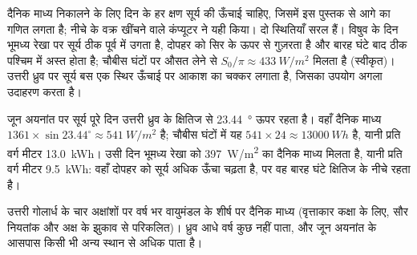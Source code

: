 दैनिक माध्य निकालने के लिए दिन के हर क्षण सूर्य की ऊँचाई चाहिए, जिसमें इस पुस्तक से
आगे का गणित लगता है; नीचे के वक्र खींचने वाले कंप्यूटर ने यही किया। दो स्थितियाँ सरल
हैं। विषुव के दिन भूमध्य रेखा पर सूर्य ठीक पूर्व में उगता है, दोपहर को सिर के ऊपर से गुज़रता है
और बारह घंटे बाद ठीक पश्चिम में अस्त होता है; चौबीस घंटों पर औसत लेने से
$S_0/\pi \approx \qty{433}{W/m^2}$ मिलता है (स्वीकृत)। उत्तरी ध्रुव पर
सूर्य बस एक स्थिर ऊँचाई पर आकाश का चक्कर लगाता है, जिसका उपयोग अगला उदाहरण
करता है।

\begin{example}[जून में ध्रुव]\label{ex:g10:earth-energy-budget:pole}
जून अयनांत पर सूर्य पूरे दिन उत्तरी ध्रुव के क्षितिज से \qty{23.44}{\degree} ऊपर
रहता है। वहाँ दैनिक माध्य  $1361
\times \sin 23.44^\circ \approx \qty{541}{W/m^2}$ है; चौबीस घंटों में
यह $541 \times 24 \approx \qty{13000}{Wh}$ है, यानी प्रति वर्ग मीटर \qty{13.0}{kWh}।
उसी दिन भूमध्य रेखा को
\qty{397}{W/m^2} का दैनिक माध्य मिलता है, यानी प्रति वर्ग मीटर \qty{9.5}{kWh}: वहाँ
दोपहर को सूर्य अधिक ऊँचा चढ़ता है, पर वह बारह घंटे क्षितिज के नीचे रहता है।
\end{example}

\begin{omfigure}

{\small उत्तरी गोलार्ध के चार अक्षांशों पर वर्ष भर वायुमंडल के शीर्ष पर दैनिक माध्य 
(वृत्ताकार कक्षा के लिए, सौर नियतांक और अक्ष के झुकाव से परिकलित)। ध्रुव
आधे वर्ष कुछ नहीं पाता, और जून अयनांत के आसपास किसी भी अन्य स्थान से अधिक पाता है।}
\end{omfigure}

